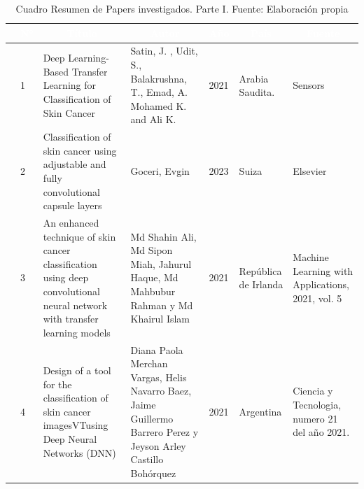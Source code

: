 \begin{table}[h]
	\newcommand{\multirot}[1]{\multirow{2}{*}[-8ex]{\rotcell{\rlap{#1}}}}
	\footnotesize
	\centering
	\begin{longtable}{|m{0.5cm}|m{0.3cm}|m{4cm}|m{2cm}|m{0.6cm}|m{1.7cm}|m{3cm}|} 
		\hline
		\rowcolor[rgb]{0,0.251,0.502} \multicolumn{1}{|c|}{\textcolor{white}{Tipo}} & \multicolumn{1}{c|}{\textcolor{white}{N°}} & \multicolumn{1}{c|}{\textcolor{white}{Título}}                                                                             & \multicolumn{1}{c|}{\textcolor{white}{Autor}}        & \multicolumn{1}{c|}{\textcolor{white}{Año}} & \multicolumn{1}{c|}{\textcolor{white}{País}} & \multicolumn{1}{c|}{\textcolor{white}{Fuente}}                                                        \\ 
		\hline
		\multirot{Problema}                                        & 1                                             & Deep Learning-Based Transfer Learning for Classification of Skin Cancer~                                                                               & Satin, J. , Udit, S., Balakrushna, T., Emad, A. Mohamed K. and Ali K. & 2021 &  Arabia Saudita. & Sensors \\ 
		\cline{2-7}
		& 2& Classification of skin cancer using adjustable and fully convolutional capsule layers & Goceri, Evgin & 2023& Suiza & Elsevier \\ 
		\hline
		\multirow{3}{*}[-14ex]{\rotcell{\rlap{Propuesta}}}
		& 3                                             & An enhanced technique of skin cancer classification using deep convolutional neural network with transfer learning models~                                                                               & Md Shahin Ali, Md Sipon Miah, Jahurul Haque, Md Mahbubur Rahman y Md Khairul Islam                                 & 2021                                        &  República de Irlanda         & Machine Learning with Applications, 2021, vol. 5                                                                  \\ 
		\cline{2-7}
		& 4 & Design of a tool for the classification of skin cancer imagesVTusing Deep Neural Networks (DNN) & Diana Paola Merchan Vargas, Helis Navarro Baez, Jaime Guillermo Barrero Perez y Jeyson Arley Castillo Bohórquez   & 2021& Argentina       & Ciencia y Tecnologia, numero 21 del año 2021.                                                    \\ 
	
		
		\hline
	\end{longtable}
	\caption{Cuadro Resumen de Papers investigados. Parte I. Fuente: Elaboración propia}
\label{A:table}
\end{table}


